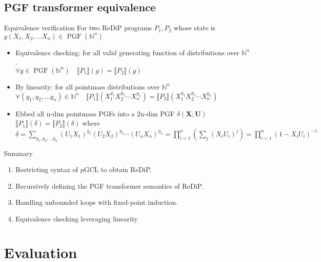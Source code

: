 \documentclass[8pt]{beamer}
\DeclareMathOperator*{\PGF}{PGF}
\renewcommand{\S}[1]{ \llbracket #1 \rrbracket }
\begin{document}
\subsection{PGF transformer equivalence}
\begin{frame}{Equivalence verification}
	For two ReDiP programs \(P_1,P_2\) whose state is \(g(X_1,X_2,\ldots X_n)\in\PGF(\mathbb{N}^n)\)

	\begin{itemize}
		\item Equivalence checking: for all valid generating function of distributions over \(\mathbb{N}^n\).\\
		      \(\displaystyle \forall g \in\PGF(\mathbb{N}^n) \quad \S{P_1}(g) = \S{P_2}(g) \)
		\item By linearity: for all pointmass distributions over \(\mathbb{N}^n\)\\
		      \(\displaystyle \forall (y_1,y_2,\ldots y_n) \in \mathbb{N}^n \quad \S{P_1}(X_1^{y_1}X_2^{y_2}\cdots X_n^{y_n}) = \S{P_2}(X_1^{y_1}X_2^{y_2}\cdots X_n^{y_n}) \)
		\item Ebbed all n-dim pointmass PGFs into a 2n-dim PGF \(\delta(\mathbf{X};\mathbf{U})\)\\
		      \(\displaystyle \S{P_1}(\delta) = \S{P_2}(\delta) \)
		      where
		      \(
		      \displaystyle
		      \delta
		      = \sum_{y_1,y_2,\ldots y_n} (U_1X_1)^{y_1}(U_2X_2)^{y_2}\cdots (U_nX_n)^{y_n}
		      = \prod_{i=1}^n \left( \sum_j (X_iU_i)^j \right)
		      = \prod_{i=1}^n (1-X_iU_i)^{-1}
		      \)
	\end{itemize}
\end{frame}
\begin{frame}{Summary}
	\begin{enumerate}
		\item Restricting syntax of pGCL to obtain ReDiP.
		\item Recursively defining the PGF transformer semantics of ReDiP.
		\item Handling unbounded loops with fixed-point induction.
		\item Equivalence checking leveraging linearity
	\end{enumerate}
\end{frame}

\section{Evaluation}
\end{document}
